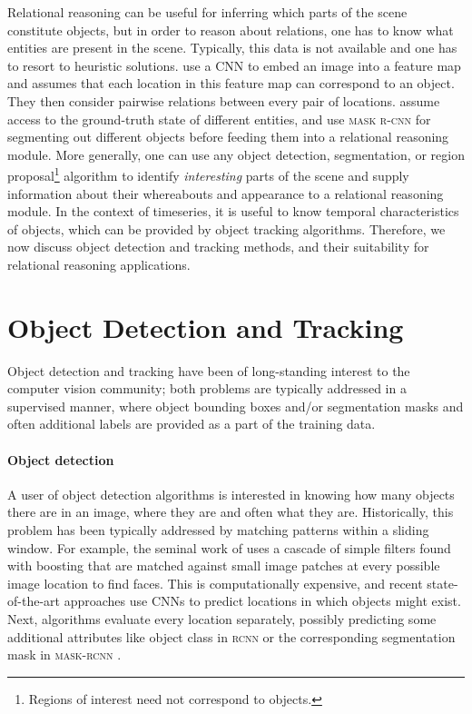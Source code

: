 	 Relational reasoning can be useful for inferring which parts of the scene constitute objects, but in order to reason about relations, one has to know what entities are present in the scene. 
	 Typically, this data is not available and one has to resort to heuristic solutions.
	 \cite{Santoro2017} use a \gls{CNN} to embed an image into a feature map and assumes that each location in this feature map can correspond to an object. 
	 They then consider pairwise relations between every pair of locations.
	 \cite{Battaglia2016,Baker2019tooluse} assume access to the ground-truth state of different entities,
	 and \cite{Yi2019cleverer} use \textsc{mask r-cnn} \citep{He2017maskrcnn} for segmenting out different objects before feeding them into a relational reasoning module.
	 More generally, one can use any object detection, segmentation, or region proposal\footnote{Regions of interest need not correspond to objects.} algorithm to identify \textit{interesting} parts of the scene and supply information about their whereabouts and appearance to a relational reasoning module.
	 In the context of timeseries, it is useful to know temporal characteristics of objects, which can be provided by object tracking algorithms.
	 Therefore, we now discuss object detection and tracking methods, and their suitability for relational reasoning applications.
	 
\section{Object Detection and Tracking}
\label{sec:object_det_track}

	Object detection and tracking have been of long-standing interest to the computer vision community;
	both problems are typically addressed in a supervised manner, where object bounding boxes and/or segmentation masks and often additional labels are provided as a part of the training data.
	\paragraph{Object detection}
	A user of object detection algorithms is interested in knowing how many objects there are in an image, where they are and often what they are. 
	Historically, this problem has been typically addressed by matching patterns within a sliding window.
	For example, the seminal work of \cite{Viola2001face} uses a cascade of simple filters found with boosting \citep{Schapire1999boosting} that are matched against small image patches at every possible image location to find faces.
	This is computationally expensive, and recent state-of-the-art approaches use \gls{CNN}s to predict locations in which objects might exist.
	Next, algorithms evaluate every location separately, possibly predicting some additional attributes like object class in \textsc{rcnn} \citep{Girshick2013rcnn,Ren2015fasterrcnn} or the corresponding segmentation mask in \textsc{mask-rcnn} \citep{He2017maskrcnn}.
	
